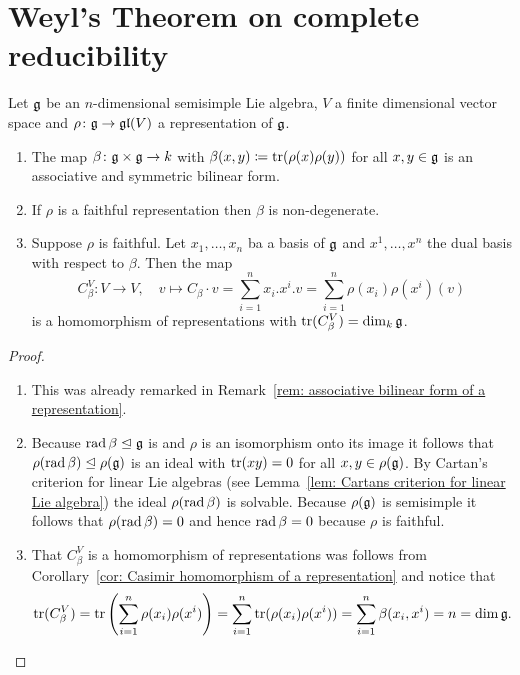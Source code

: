 \section{Weyl’s Theorem on complete reducibility}


\begin{lemma}\label{lem: Casimirs endomorphism for Weyl}
 Let $\mathfrak{g}$ be an $n$-dimensional semisimple Lie algebra, $V$ a finite dimensional vector space and $\rho \colon \mathfrak{g} \to \mathfrak{gl}(V)$ a representation of $\mathfrak{g}$.
 \begin{enumerate}
  \item
   The map $\beta \colon \mathfrak{g} \times \mathfrak{g} \to k$ with $\beta(x,y) \coloneqq \operatorname{tr}(\rho(x)\rho(y))$ for all $x,y \in \mathfrak{g}$ is an associative and symmetric bilinear form.
  \item
   If $\rho$ is a faithful representation then $\beta$ is non-degenerate.
  \item
   Suppose $\rho$ is faithful. Let $x_1, \dotsc, x_n$ ba a basis of $\mathfrak{g}$ and $x^1, \dotsc, x^n$ the dual basis with respect to $\beta$. Then the map
   \[
    C_\beta^V \colon V \to V,
    \quad
    v \mapsto C_\beta \cdot v = \sum_{i=1}^n x_i.x^i.v = \sum_{i=1}^n \rho(x_i)\rho(x^i)(v)
   \]
   is a homomorphism of representations with $\operatorname{tr}(C_\beta^V) = \dim_k \mathfrak{g}$.
 \end{enumerate}
\end{lemma}
\begin{proof}
 \begin{enumerate}[leftmargin=*]
  \item
   This was already remarked in Remark~\ref{rem: associative bilinear form of a representation}.
  \item
   Because $\operatorname{rad} \beta \trianglelefteq \mathfrak{g}$ is and $\rho$ is an isomorphism onto its image it follows that $\rho(\operatorname{rad} \beta) \trianglelefteq \rho(\mathfrak{g})$ is an ideal with $\operatorname{tr}(xy) = 0$ for all $x,y \in \rho(\mathfrak{g})$. By Cartan’s criterion for linear Lie algebras (see Lemma~\ref{lem: Cartans criterion for linear Lie algebra}) the ideal $\rho(\operatorname{rad} \beta)$ is solvable. Because $\rho(\mathfrak{g})$ is semisimple it follows that $\rho(\operatorname{rad} \beta) = 0$ and hence $\operatorname{rad} \beta = 0$ because $\rho$ is faithful.
  \item
   That $C_\beta^V$ is a homomorphism of representations was follows from Corollary~\ref{cor: Casimir homomorphism of a representation} and notice that
   \[
    \operatorname{tr}(C_\beta^V)
    = \operatorname{tr}\left( \sum_{i=1}^n \rho(x_i)\rho(x^i) \right)
    = \sum_{i=1}^n \operatorname{tr}(\rho(x_i)\rho(x^i))
    = \sum_{i=1}^n \beta(x_i, x^i)
    = n
    = \dim \mathfrak{g}.
    \qedhere
   \]
 \end{enumerate}
\end{proof}


